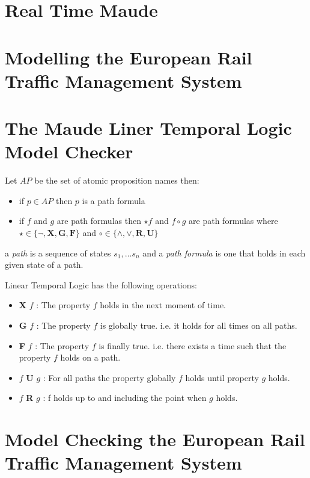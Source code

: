 \section{Real Time Maude}

\section{Modelling the European Rail Traffic Management System}

\section{The Maude Liner Temporal Logic Model Checker}

\begin{definition}
Let $AP$ be the set of atomic proposition names then:

\begin{itemize}
\item if $p \in AP$ then $p$ is a path formula

\item if $f$ and $g$ are path formulas then $\star f$ and $f \circ g$ are path formulas where $\star \in \{\neg,\mathbf{X},\mathbf{G}, \mathbf{F}\}$ and $\circ \in \{ \wedge,\vee,\textbf{R},\textbf{U} \}$
\end{itemize}

\end{definition}

a \emph{path} is a sequence of states $s_1, \ldots s_n$ and a \emph{path formula} is one that holds in each given state of a path.


Linear Temporal Logic has the following operations:

\begin{itemize}
\item \textbf{X} $f$ : The property $f$ holds in the \alert{next} moment of time. \\
\item \textbf{G} $f$ : The property $f$ is \alert{globally} true. i.e. it holds for all times on all paths. \\
\item \textbf{F} $f$ : The property $f$ is \alert{finally} true. i.e. there exists a time such that the property $f$ holds on a path. \\
\item $f$ \textbf{U} $g$ : For all paths the property globally $f$ holds \alert{until} property $g$ holds. \\
\item $f$ \textbf{R} $g$ : f holds up to and including the point when $g$ holds.\\
\end{itemize}





\section{Model Checking the European Rail Traffic Management System}
